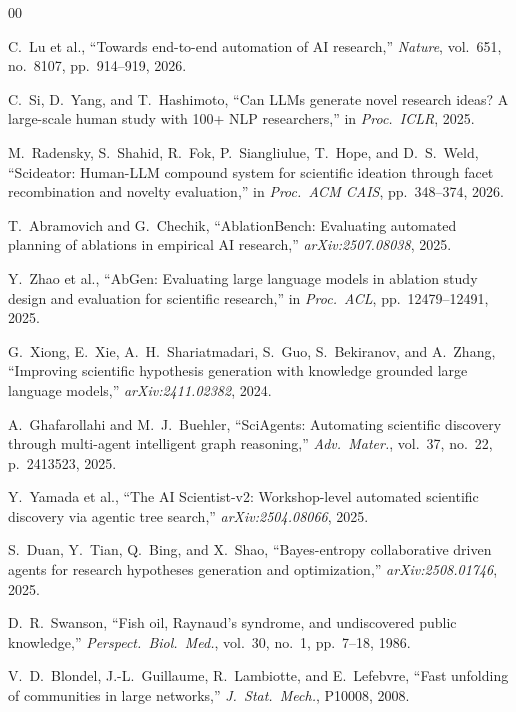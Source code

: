 \documentclass[conference]{IEEEtran}
\begin{document}
\begin{thebibliography}{00}

 C.~Lu et al., ``Towards end-to-end automation of AI research,'' \textit{Nature}, vol.~651, no.~8107, pp.~914--919, 2026.

 C.~Si, D.~Yang, and T.~Hashimoto, ``Can LLMs generate novel research ideas? A large-scale human study with 100+ NLP researchers,'' in \textit{Proc.\ ICLR}, 2025.

 M.~Radensky, S.~Shahid, R.~Fok, P.~Siangliulue, T.~Hope, and D.~S.~Weld, ``Scideator: Human-LLM compound system for scientific ideation through facet recombination and novelty evaluation,'' in \textit{Proc.\ ACM CAIS}, pp.~348--374, 2026.

 T.~Abramovich and G.~Chechik, ``AblationBench: Evaluating automated planning of ablations in empirical AI research,'' \textit{arXiv:2507.08038}, 2025.

 Y.~Zhao et al., ``AbGen: Evaluating large language models in ablation study design and evaluation for scientific research,'' in \textit{Proc.\ ACL}, pp.~12479--12491, 2025.

 G.~Xiong, E.~Xie, A.~H.~Shariatmadari, S.~Guo, S.~Bekiranov, and A.~Zhang, ``Improving scientific hypothesis generation with knowledge grounded large language models,'' \textit{arXiv:2411.02382}, 2024.

 A.~Ghafarollahi and M.~J.~Buehler, ``SciAgents: Automating scientific discovery through multi-agent intelligent graph reasoning,'' \textit{Adv.\ Mater.}, vol.~37, no.~22, p.~2413523, 2025.

 Y.~Yamada et al., ``The AI Scientist-v2: Workshop-level automated scientific discovery via agentic tree search,'' \textit{arXiv:2504.08066}, 2025.

 S.~Duan, Y.~Tian, Q.~Bing, and X.~Shao, ``Bayes-entropy collaborative driven agents for research hypotheses generation and optimization,'' \textit{arXiv:2508.01746}, 2025.

 D.~R.~Swanson, ``Fish oil, Raynaud's syndrome, and undiscovered public knowledge,'' \textit{Perspect.\ Biol.\ Med.}, vol.~30, no.~1, pp.~7--18, 1986.

 V.~D.~Blondel, J.-L.~Guillaume, R.~Lambiotte, and E.~Lefebvre, ``Fast unfolding of communities in large networks,'' \textit{J.\ Stat.\ Mech.}, P10008, 2008.


\end{thebibliography}
\end{document}
